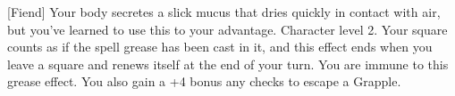  {[Fiend]}
\shortdescfeat
{Your body secretes a slick mucus that dries quickly in contact with air, but you've learned to use this to your advantage.}
{Character level 2.}
{Your square counts as if the spell grease has been cast in it, and this effect ends when you leave a square and renews itself at the end of your turn. You are immune to this grease effect. You also gain a +4 bonus any checks to escape a Grapple.}